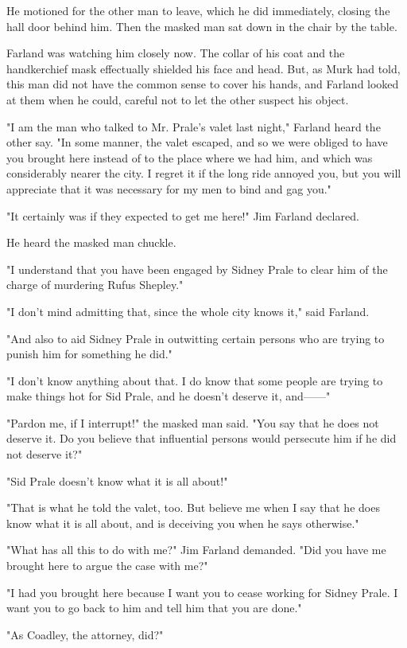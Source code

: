 \documentclass{novel}
\begin{document}
He motioned for the other man to leave, which he did immediately, closing the hall door behind him. Then the masked man sat down in the chair by the table.

Farland was watching him closely now. The collar of his coat and the handkerchief mask effectually shielded his face and head. But, as Murk had told, this man did not have the common sense to cover his hands, and Farland looked at them when he could, careful not to let the other suspect his object.

"I am the man who talked to Mr. Prale's valet last night," Farland heard the other say. "In some manner, the valet escaped, and so we were obliged to have you brought here instead of to the place where we had him, and which was considerably nearer the city. I regret it if the long ride annoyed you, but you will appreciate that it was necessary for my men to bind and gag you."

"It certainly was if they expected to get me here!" Jim Farland declared.

He heard the masked man chuckle.

"I understand that you have been engaged by Sidney Prale to clear him of the charge of murdering Rufus Shepley."

"I don't mind admitting that, since the whole city knows it," said Farland.

"And also to aid Sidney Prale in outwitting certain persons who are trying to punish him for something he did."

"I don't know anything about that. I do know that some people are trying to make things hot for Sid Prale, and he doesn't deserve it, and------"

"Pardon me, if I interrupt!" the masked man said. "You say that he does not deserve it. Do you believe that influential persons would persecute him if he did not deserve it?"

"Sid Prale doesn't know what it is all about!"

"That is what he told the valet, too. But believe me when I say that he does know what it is all about, and is deceiving you when he says otherwise."

"What has all this to do with me?" Jim Farland demanded. "Did you have me brought here to argue the case with me?"

"I had you brought here because I want you to cease working for Sidney Prale. I want you to go back to him and tell him that you are done."

"As Coadley, the attorney, did?"
\end{document}

